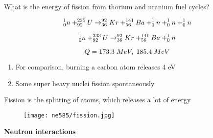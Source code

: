 \documentclass[aspectratio=1610,pdftex,dvipsnames,compress,xcolor={dvipsnames}]{beamer}
\begin{document}
\addtocounter{framenumber}{-1} 
\begin{frame}{What is the energy of fission from thorium and uranium fuel cycles?}

    \begin{equation}
        \LARGE
        ^1_0n + ^{235}_{92}U \rightarrow ^{92}_{36}Kr + ^{141}_{56}Ba + ^1_0n + ^1_0n + ^1_0n  
    \end{equation}

    \begin{equation}
        \LARGE
        ^1_0n + ^{233}_{92}U \rightarrow ^{92}_{36}Kr + ^{141}_{56}Ba + ^1_0n   
    \end{equation}

    \begin{equation}
        \LARGE
        Q = 173.3 \; MeV, \; 185.4 \; MeV
    \end{equation}

    \vspace*{\fill}

    \begin{enumerate}[series=outerlist,topsep=0pt,itemsep=21pt,leftmargin=*,label=(\arabic*)]
        \item[]For comparison, burning a carbon atom releases 4 eV
        \item[]Some super heavy nuclei fission spontaneously
    \end{enumerate}
\end{frame}


\begin{frame}{Fission is the splitting of atoms, which releases a lot of energy}
    \begin{figure}
        \centering
        \texttt{[image: ne585/fission.jpg]}
    \end{figure}
\end{frame}


\begin{frame}[plain]{}
    \centering\LARGE\textbf{Neutron interactions}
\end{frame}
\end{document}
